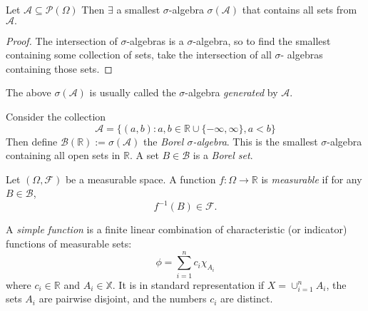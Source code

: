 \begin{lemma}
    Let $\mathcal{A}\subseteq\mathcal{P}(\Omega)$ Then $\exists$ a smallest $\sigma$-algebra 
    $\sigma(\mathcal{A})$ that contains all sets from $\mathcal{A}.$
\end{lemma}
\begin{proof}
    The intersection of $\sigma$-algebras is a $\sigma$-algebra, so to find the 
    smallest containing some collection of sets, take the intersection of all $\sigma$-
    algebras containing those sets.
\end{proof}

\begin{remark}
    The above $\sigma(\mathcal{A})$ is usually called the $\sigma$-algebra
    \emph{generated} by $\mathcal{A}$.
\end{remark}

\begin{definition}
    Consider the collection 
    \begin{equation*}
        \mathcal{A}=\{(a,b):a,b\in\mathbb{R}\cup\{-\infty,\infty\},a<b\}
    \end{equation*}
    Then define $\mathcal{B}(\mathbb{R}):=\sigma(\mathcal{A})$ the \emph{Borel 
    $\sigma$-algebra}. This is the smallest $\sigma$-algebra containing all open
    sets in $\mathbb{R}$. A set $B\in\mathcal{B}$ is a \emph{Borel set}.
\end{definition}

\begin{definition}
    Let $(\Omega,\mathcal{F})$ be a measurable space. A function $f:\Omega\rightarrow\mathbb{R}$
    is \emph{measurable} if for any $B\in\mathcal{B}$,
    \begin{equation*}
        f^{-1}(B)\in\mathcal{F}.
    \end{equation*}
\end{definition}

\begin{definition}
    A \emph{simple function} is a finite linear combination of 
    characteristic (or indicator) functions of measurable sets:
    \begin{equation}
        \phi=\sum_{i=1}^nc_i\chi_{A_i}
    \end{equation}
    where $c_i\in\mathbb{R}$ and $A_i\in\mathbb{X}$.
    It is in standard representation if $X=\cup_{i=1}^nA_i$,
    the sets $A_i$ are pairwise disjoint, and the numbers $c_i$
    are distinct.
\end{definition}

